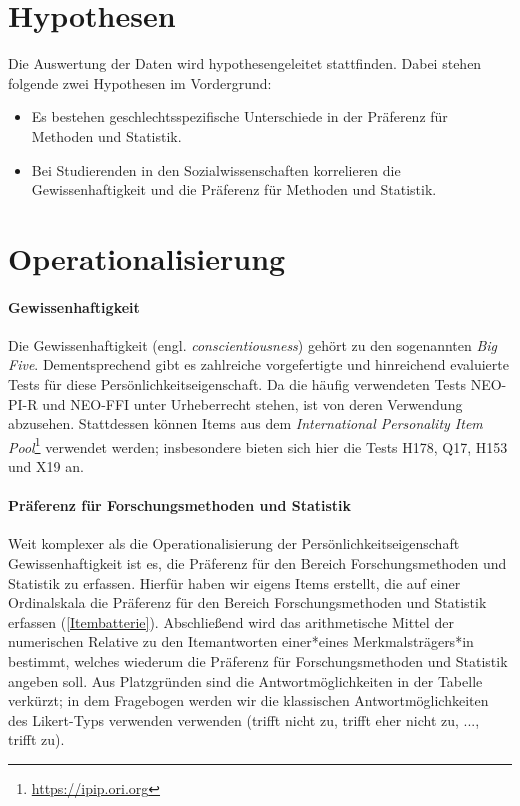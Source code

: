 \documentclass[doc]{apa7}
\begin{document}
\section{Hypothesen}
Die Auswertung der Daten wird hypothesengeleitet stattfinden. Dabei stehen folgende zwei Hypothesen im Vordergrund:
 \begin{itemize}
     \item Es bestehen geschlechtsspezifische Unterschiede in der Präferenz für Methoden und Statistik.
     \item Bei Studierenden in den Sozialwissenschaften korrelieren die Gewissenhaftigkeit und die Präferenz für Methoden und Statistik.
 \end{itemize}


\section{Operationalisierung}
\paragraph{Gewissenhaftigkeit} Die Gewissenhaftigkeit (engl. \textit{conscientiousness}) gehört zu den sogenannten \textit{Big Five}. Dementsprechend gibt es zahlreiche vorgefertigte und hinreichend evaluierte Tests für diese Persönlichkeitseigenschaft. Da die häufig verwendeten Tests NEO-PI-R und NEO-FFI unter Urheberrecht stehen, ist von deren Verwendung abzusehen. Stattdessen können Items aus dem \textit{International Personality Item Pool}\footnote{\url{https://ipip.ori.org}} verwendet werden; insbesondere bieten sich hier die Tests H178, Q17, H153 und X19 an.

\paragraph{Präferenz für Forschungsmethoden und Statistik} Weit komplexer als die Operationalisierung der Persönlichkeitseigenschaft Gewissenhaftigkeit ist es, die Präferenz für den Bereich Forschungsmethoden und Statistik zu erfassen. Hierfür haben wir eigens Items erstellt, die auf einer Ordinalskala die Präferenz für den Bereich Forschungsmethoden und Statistik erfassen (\autoref{Itembatterie}). Abschließend wird das arithmetische Mittel der numerischen Relative zu den Itemantworten einer*eines Merkmalsträgers*in bestimmt, welches wiederum die Präferenz für Forschungsmethoden und Statistik angeben soll. Aus Platzgründen sind die Antwortmöglichkeiten in der Tabelle verkürzt; in dem Fragebogen werden wir die klassischen Antwortmöglichkeiten des Likert-Typs verwenden verwenden (trifft nicht zu, trifft eher nicht zu, ..., trifft zu).
\end{document}
